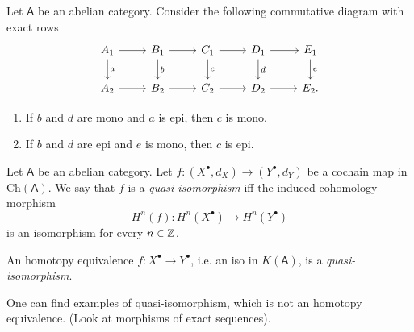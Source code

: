 \begin{lem}[$5$ lemma]
	Let $\mathsf{A}$ be an abelian category.
	Consider the following commutative diagram with exact rows
	\begin{equation}
	\begin{tikzcd}
		A_1 \arrow[r, "", rightarrow] \arrow[d, "a", rightarrow] &
		B_1 \arrow[r, "", rightarrow] \arrow[d, "b", rightarrow] &
		C_1 \arrow[r, "", rightarrow] \arrow[d, "c", rightarrow] &
		D_1 \arrow[r, "", rightarrow] \arrow[d, "d", rightarrow] &
		E_1 \arrow[d, "e", rightarrow] \\
		A_2 \arrow[r, "", rightarrow] &
		B_2 \arrow[r, "", rightarrow] &
		C_2 \arrow[r, "", rightarrow] &
		D_2 \arrow[r, "", rightarrow] &
		E_2 
	.\end{tikzcd}
	\end{equation} 
	\begin{enumerate}
		\item If $b$ and $d$ are mono and $a$ is epi, then $c$ is mono.
		\item If $b$ and $d$ are epi and $e$ is mono, then $c$ is epi.
	\end{enumerate}
\end{lem} 

\begin{defn}
	Let $\mathsf{A}$ be an abelian category.
	Let $f: \left( X^{\bullet}, d_{X} \right) \to \left( Y^{\bullet}, d_{Y} \right)$ be a cochain map in $\mathrm{Ch}(\mathsf{A})$.
	We say that $f$ is a {\em quasi-isomorphism} iff the induced cohomology morphism
	\begin{equation}
		H^n(f): H^n(X^\bullet) \to H^n(Y^\bullet)
	\end{equation} 
	is an isomorphism for every $n \in \mathbb{Z}$.
\end{defn}

\begin{lem}
	An homotopy equivalence $f\colon X^\bullet \to Y^\bullet$, i.e.
	an iso in $K(\mathsf{A})$, is a {\em quasi-isomorphism}.
\end{lem} 

\begin{lem}
	One can find examples of quasi-isomorphism, which is not an homotopy equivalence.
	(Look at morphisms of exact sequences).
\end{lem} 

